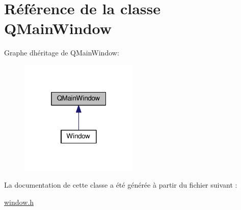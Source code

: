 \hypertarget{class_q_main_window}{}\section{Référence de la classe Q\+Main\+Window}
\label{class_q_main_window}


Graphe d\textquotesingle{}héritage de Q\+Main\+Window\+:\nopagebreak
\begin{figure}[H]
\begin{center}
\leavevmode
\includegraphics[width=160pt]{class_q_main_window__inherit__graph}
\end{center}
\end{figure}


La documentation de cette classe a été générée à partir du fichier suivant \+:\begin{DoxyCompactItemize}
\item 
\hyperlink{window_8h}{window.\+h}\end{DoxyCompactItemize}
